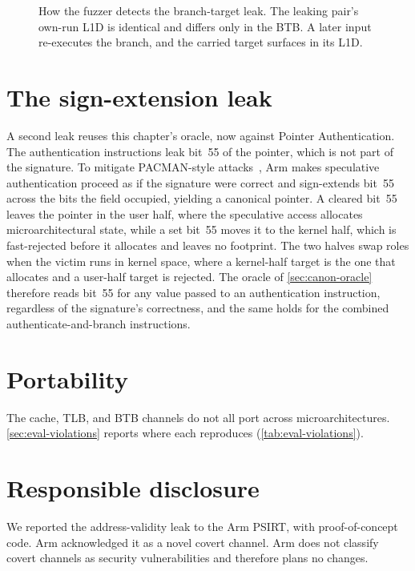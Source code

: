 \begin{figure}[t]
\centering
\fitwidth{}
\caption{How the fuzzer detects the branch-target leak. The leaking pair's own-run L1D is identical
and differs only in the BTB. A later input re-executes the branch, and the carried target surfaces
in its L1D.}
\label{fig:btb-fuzzer}
\end{figure}

\section{The sign-extension leak}
\label{sec:canon-aut}

A second leak reuses this chapter's oracle, now against Pointer Authentication. The 
authentication instructions leak bit~55 of the pointer, which is not part of the signature. To
mitigate PACMAN-style attacks~\cite{pacman,arm_pacman}, Arm makes speculative authentication proceed
as if the signature were correct and sign-extends bit~55 across the bits the  field
occupied, yielding a canonical pointer. A cleared bit~55 leaves the pointer in the user half, where
the speculative access allocates microarchitectural state, while a set bit~55 moves it to the kernel
half, which is fast-rejected before it allocates and leaves no footprint. The two halves swap roles
when the victim runs in kernel space, where a kernel-half target is the one that allocates and a
user-half target is rejected. The oracle of
\autoref{sec:canon-oracle} therefore reads bit~55 for any value passed to an authentication
instruction, regardless of the signature's correctness, and the same holds for the combined
authenticate-and-branch instructions.

\section{Portability}
\label{sec:canon-portability}

The cache, TLB, and BTB channels do not all port across microarchitectures. \autoref{sec:eval-violations} reports
where each reproduces (\autoref{tab:eval-violations}).

\section{Responsible disclosure}
\label{sec:canon-disclosure}

We reported the address-validity leak to the Arm PSIRT, with proof-of-concept code. Arm acknowledged
it as a novel covert channel. Arm does not classify covert channels as security vulnerabilities and
therefore plans no changes.
